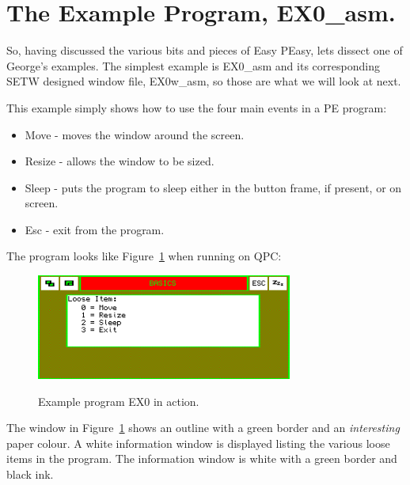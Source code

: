 \section{The Example Program, EX0\_asm.}
\label{ch26-ex0}%

So, having discussed the various bits and pieces of Easy PEasy, lets dissect
        one of George's examples. The simplest example is EX0\_asm and
        its corresponding SETW designed window file,
 EX0w\_asm, so those are what we will look at next.

This example simply shows how to use the four main events in a PE
        program:
\begin{itemize}[itemsep=0pt]

\item{}Move -{} moves the window around the screen.


\item{}Resize -{} allows the window to be sized.


\item{}Sleep -{} puts the program to sleep either in the button frame, if
                present, or on screen.


\item{}Esc -{} exit from the program.

\end{itemize}

The program looks like Figure~\ref{fig:ExampleProgramEX0InAction} when running on QPC:

\begin{figure}[h]
\center
\includegraphics[width=0.75\textwidth,keepaspectratio=true]{Content/images/peas_ex0.png}
\label{fig:ExampleProgramEX0InAction}
\caption{Example program EX0 in action.}
\end{figure}


The window in Figure~\ref{fig:ExampleProgramEX0InAction} shows an outline with a green border and an
 \emph{interesting} paper colour. A white information window is
        displayed listing the various loose items in the program. The information window
        is white with a green border and black ink.

